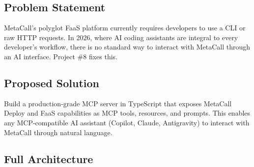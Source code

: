 \documentclass[12pt, a4paper]{article}
\begin{document}
\subsection{Problem Statement}

MetaCall's polyglot FaaS platform currently requires developers to use a
CLI or raw HTTP requests. In 2026, where AI coding assistants are
integral to every developer's workflow, there is no standard way to
interact with MetaCall through an AI interface. Project \#8 fixes this.

\subsection{Proposed Solution}

Build a production-grade MCP server in TypeScript that exposes MetaCall
Deploy and FaaS capabilities as MCP tools, resources, and prompts. This
enables any MCP-compatible AI assistant (Copilot, Claude, Antigravity)
to interact with MetaCall through natural language.

\subsection{Full Architecture}
\end{document}
